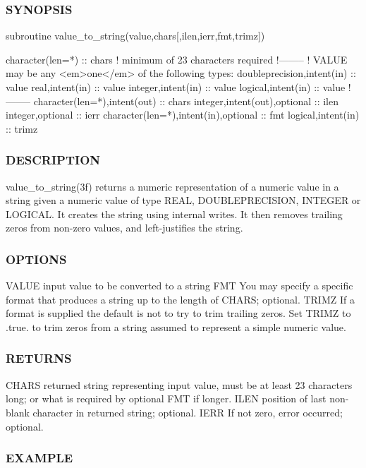 \subsubsection*{S\+Y\+N\+O\+P\+S\+IS}

\begin{DoxyVerb}subroutine value_to_string(value,chars[,ilen,ierr,fmt,trimz])

 character(len=*) :: chars  ! minimum of 23 characters required
 !--------
 ! VALUE may be any <em>one</em> of the following types:
 doubleprecision,intent(in)               :: value
 real,intent(in)                          :: value
 integer,intent(in)                       :: value
 logical,intent(in)                       :: value
 !--------
 character(len=*),intent(out)             :: chars
 integer,intent(out),optional             :: ilen
 integer,optional                         :: ierr
 character(len=*),intent(in),optional     :: fmt
 logical,intent(in)                       :: trimz
\end{DoxyVerb}


\subsubsection*{D\+E\+S\+C\+R\+I\+P\+T\+I\+ON}

value\+\_\+to\+\_\+string(3f) returns a numeric representation of a numeric value in a string given a numeric value of type R\+E\+AL, D\+O\+U\+B\+L\+E\+P\+R\+E\+C\+I\+S\+I\+ON, I\+N\+T\+E\+G\+ER or L\+O\+G\+I\+C\+AL. It creates the string using internal writes. It then removes trailing zeros from non-\/zero values, and left-\/justifies the string.

\subsubsection*{O\+P\+T\+I\+O\+NS}

V\+A\+L\+UE input value to be converted to a string F\+MT You may specify a specific format that produces a string up to the length of C\+H\+A\+RS; optional. T\+R\+I\+MZ If a format is supplied the default is not to try to trim trailing zeros. Set T\+R\+I\+MZ to .true. to trim zeros from a string assumed to represent a simple numeric value.

\subsubsection*{R\+E\+T\+U\+R\+NS}

C\+H\+A\+RS returned string representing input value, must be at least 23 characters long; or what is required by optional F\+MT if longer. I\+L\+EN position of last non-\/blank character in returned string; optional. I\+E\+RR If not zero, error occurred; optional. \subsubsection*{E\+X\+A\+M\+P\+LE}

